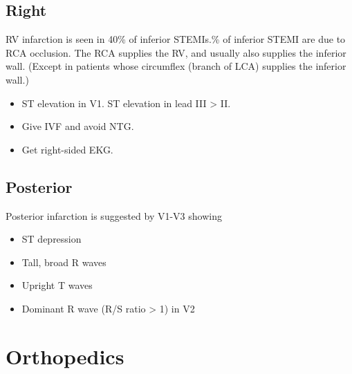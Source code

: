 \documentclass[8pt]{extarticle}
\begin{document}
\subsection{Right}
RV infarction is seen in 40\% of inferior STEMIs.\% of inferior STEMI are due to RCA occlusion. The RCA supplies the RV, and usually also supplies the inferior wall. (Except in patients whose circumflex (branch of LCA) supplies the inferior wall.)
\begin{itemize}
    \item ST elevation in V1. ST elevation in lead III > II.
    \item Give IVF and avoid NTG.
    \item Get right-sided EKG.
\end{itemize}
\subsection{Posterior}
Posterior infarction is suggested by V1-V3 showing
\begin{itemize}
    \item ST depression
    \item Tall, broad R waves
    \item Upright T waves
    \item Dominant R wave (R/S ratio > 1) in V2
\end{itemize}

\section{Orthopedics}
\end{document}
